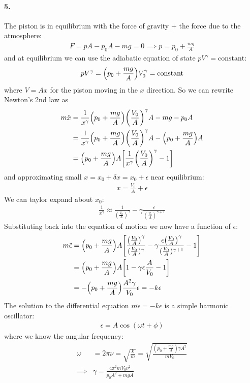 \documentclass[../main.tex]{subfiles}
\begin{document}
\newpage
\paragraph{5.} The piston is in equilibrium with the force of gravity $+$ the force due to the atmosphere:
\begin{align*}
    F = pA - p_0 A - mg = 0 \implies p = p_0 + \frac{mg}{A} 
\end{align*}
and at equilibrium we can use the adiabatic equation of state $pV^\gamma = \text{constant}$:
\begin{align*}
    pV^\gamma = \qt(p_0 + \frac{mg}{A}) V_0^\gamma = \text{constant}
\end{align*}
where $V = A x$ for the piston moving in the $x$ direction. So we can rewrite Newton's 2nd law as
\begin{align*}
    m \ddot x &= \frac{1}{x^\gamma} \qt(p_0 + \frac{mg}{A}) \qt(\frac{V_0}{A})^\gamma A - mg - p_0 A \\
    &=\frac{1}{x^\gamma} \qt(p_0 + \frac{mg}{A}) \qt(\frac{V_0}{A})^\gamma A - \qt(p_0 + \frac{mg}{A}) A \\ 
    &= \qt(p_0 + \frac{mg}{A}) A \qt[
        \frac{1}{x^\gamma} \qt(\frac{V_0}{A})^\gamma - 1
    ]
\end{align*}
and approximating small $x = x_0 + \delta x = x_0 + \epsilon$ near equilibrium:
\begin{align*}
    x = \frac{V_0}{A} + \epsilon
\end{align*}
We can taylor expand about $x_0$:
\begin{align*}
    \frac{1}{x^\gamma} \approx \frac{1}{(\frac{V_0}{A})^\gamma} - \gamma \frac{\epsilon}{(\frac{V_0}{A})^{\gamma + 1}}
\end{align*}
Substituting back into the equation of motion we now have a function of $\epsilon$:
\begin{align*}
    m \ddot \epsilon &= \qt(p_0 + \frac{mg}{A}) A \qt[
        \frac{\qt(\frac{V_0}{A})^\gamma}{(\frac{V_0}{A})^\gamma} - \gamma \frac{\epsilon \qt(\frac{V_0}{A})^\gamma}{(\frac{V_0}{A})^{\gamma + 1}} - 1
    ] \\
    &= \qt(p_0 + \frac{mg}{A}) A \qt[
        1 - \gamma \epsilon \frac{A}{V_0} - 1
    ] \\
    &= -\qt(p_0 + \frac{mg}{A}) \frac{A^2 \gamma}{V_0}  \epsilon = -k \epsilon
\end{align*}
The solution to the differential equation $m \ddot \epsilon = -k \epsilon$ is a simple harmonic oscillator:
\begin{align*}
    \epsilon = A \cos(\omega t + \phi)
\end{align*}
where we know the angular frequency:
\begin{align*}
    \omega &= 2 \pi \nu = \sqrt{\frac{k}{m}} = \sqrt{\frac{(p_0 + \frac{mg}{A}) \gamma A^2}{mV_0}} \\
    \implies &\boxed{
        \gamma = \frac{4\pi^2 mV_0 \nu^2}{p_0 A^2 + mg A}
    }
\end{align*}
\end{document}
